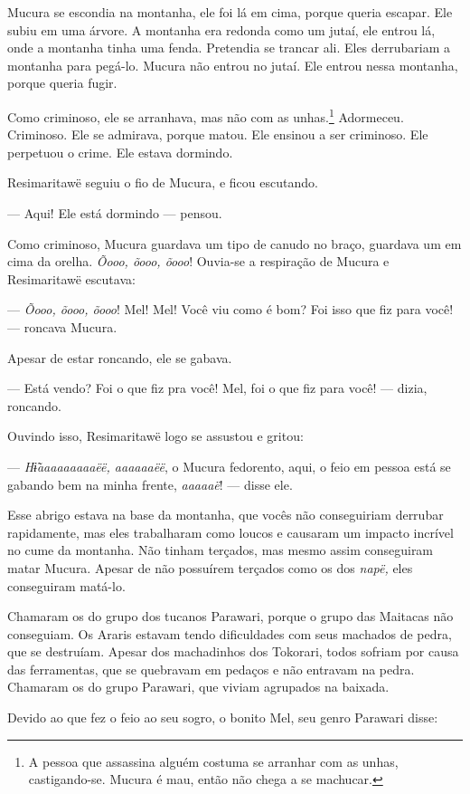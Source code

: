 Mucura se escondia na montanha, ele foi lá em cima, porque queria
escapar. Ele subiu em uma árvore. A montanha era redonda como um jutaí,
ele entrou lá, onde a montanha tinha uma fenda. Pretendia se trancar
ali. Eles derrubariam a montanha para pegá-lo. Mucura não entrou no
jutaí. Ele entrou nessa montanha, porque queria fugir. 

Como criminoso, ele se arranhava, mas não com as
unhas.\footnote{A pessoa que assassina alguém costuma se arranhar com as unhas,
castigando-se. Mucura é mau, então não chega a se machucar.}  Adormeceu. Criminoso. Ele se admirava, porque
matou. Ele ensinou a ser criminoso. Ele perpetuou o crime. Ele estava
dormindo. 

Resimaritawë seguiu o fio de Mucura, e ficou escutando. 

--- Aqui! Ele está dormindo --- pensou.

Como criminoso, Mucura guardava um tipo de canudo no braço, guardava um
em cima da orelha. \textit{Õooo, õooo, õooo}! Ouvia-se a respiração de
Mucura e Resimaritawë escutava:

--- \textit{Õooo, õooo, õooo}! Mel! Mel! Você viu como é bom? Foi isso que
fiz para você! --- roncava Mucura. 

Apesar de estar roncando, ele se gabava. 

--- Está vendo? Foi o que fiz pra você! Mel, foi o que fiz para você!
--- dizia, roncando.

Ouvindo isso, Resimaritawë logo se assustou e gritou: 

--- \textit{Hɨ̃aaaaaaaaaëë, aaaaaaëë}, o Mucura fedorento, aqui, o feio em
pessoa está se gabando bem na minha frente, \textit{aaaaaë}! --- disse ele. 

Esse abrigo estava na base da montanha, que vocês não conseguiriam
derrubar rapidamente, mas eles trabalharam como loucos e causaram um
impacto incrível no cume da montanha. Não tinham terçados, mas mesmo
assim conseguiram matar Mucura. Apesar de não possuírem terçados como os
dos \textit{napë,} eles conseguiram matá-lo. 

Chamaram os do grupo dos tucanos Parawari, porque o grupo das
Maitacas não conseguiam. Os Araris estavam tendo dificuldades com seus
machados de pedra, que se destruíam. Apesar dos machadinhos
dos Tokorari, todos sofriam por causa das ferramentas, que se
quebravam em pedaços e não entravam na pedra. Chamaram os do grupo
Parawari, que viviam agrupados na baixada. 

Devido ao que fez o feio ao seu sogro, o bonito Mel, seu genro Parawari
disse:

